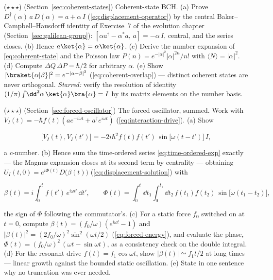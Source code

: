 \begin{problemset}
\item ($\star\star\star$) (Section~\ref{sec:coherent-states}) Coherent-state BCH. (a) Prove $D^\dagger(\alpha)\,a\,D(\alpha) = a + \alpha\,I$ (\eqref{eq:displacement-operator}) by the central Baker--Campbell--Hausdorff identity of Exercise~7 of the evolution chapter (Section~\ref{sec:galilean-group}): $[\alpha a^\dagger - \alpha^{*}a,\, a] = -\alpha\,I$, central, and the series closes. (b) Hence $a\ket{\alpha} = \alpha\ket{\alpha}$. (c) Derive the number expansion of \eqref{eq:coherent-state} and the Poisson law $P(n) = e^{-|\alpha|^2}|\alpha|^{2n}/n!$ with $\langle N\rangle = |\alpha|^2$. (d) Compute $\Delta Q\,\Delta P = \hbar/2$ for arbitrary $\alpha$. (e) Show $|\braket{\alpha|\beta}|^2 = e^{-|\alpha - \beta|^2}$ (\eqref{eq:coherent-overlap}) --- distinct coherent states are never orthogonal. \emph{Starred:} verify the resolution of identity $(1/\pi)\int\!\dd^2\alpha\,\ket{\alpha}\bra{\alpha} = I$ by its matrix elements on the number basis.

\item ($\star\star\star$) (Section~\ref{sec:forced-oscillator}) The forced oscillator, summed. Work with $V_I(t) = -\hbar f(t)(ae^{-i\omega t} + a^\dagger e^{i\omega t})$ (\eqref{eq:interaction-drive}). (a) Show
\begin{linenomath}
    \begin{equation*}
        \bigl[V_I(t), V_I(t')\bigr] = -2i\hbar^2 f(t)f(t')\,\sin\bigl[\omega(t - t')\bigr]\,I ,
    \end{equation*}
\end{linenomath}
a $c$-number. (b) Hence sum the time-ordered series \eqref{eq:time-ordered-exp} exactly --- the Magnus expansion closes at its second term by centrality --- obtaining $U_I(t, 0) = e^{i\Phi(t)}D\bigl(\beta(t)\bigr)$ (\eqref{eq:displacement-solution}) with
\begin{linenomath}
    \begin{equation*}
        \beta(t) = i\int_0^t f(t')\,e^{i\omega t'}\,\dd t',
        \qquad
        \Phi(t) = \int_0^t\!\dd t_1\!\int_0^{t_1}\!\dd t_2\,f(t_1)f(t_2)\,\sin\bigl[\omega(t_1 - t_2)\bigr] ,
    \end{equation*}
\end{linenomath}
the sign of $\Phi$ following the commutator's. (c) For a static force $f_0$ switched on at $t = 0$, compute $\beta(t) = (f_0/\omega)(e^{i\omega t} - 1)$ and $|\beta(t)|^2 = (2f_0/\omega)^2\sin^2(\omega t/2)$ (\eqref{eq:forced-energy}), and evaluate the phase, $\Phi(t) = (f_0/\omega)^2\,(\omega t - \sin\omega t)$, as a consistency check on the double integral. (d) For the resonant drive $f(t) = f_1\cos\omega t$, show $|\beta(t)| \simeq f_1 t/2$ at long times --- linear growth against the bounded static oscillation. (e) State in one sentence why no truncation was ever needed.


\end{problemset}

